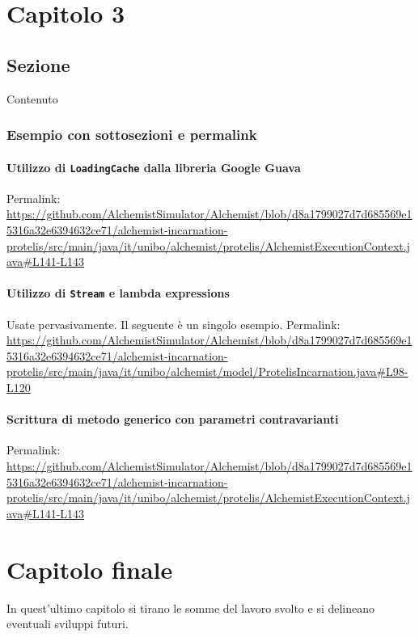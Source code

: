\documentclass[a4paper,12pt]{report}
\begin{document}
\chapter{Capitolo 3}
\section{Sezione}

Contenuto

\subsection{Esempio con sottosezioni e permalink}

\subsubsection{Utilizzo di \texttt{LoadingCache} dalla libreria Google Guava}

Permalink: \url{https://github.com/AlchemistSimulator/Alchemist/blob/d8a1799027d7d685569e15316a32e6394632ce71/alchemist-incarnation-protelis/src/main/java/it/unibo/alchemist/protelis/AlchemistExecutionContext.java#L141-L143}

\subsubsection{Utilizzo di \texttt{Stream} e lambda expressions}

Usate pervasivamente. Il seguente è un singolo esempio.
Permalink: \url{https://github.com/AlchemistSimulator/Alchemist/blob/d8a1799027d7d685569e15316a32e6394632ce71/alchemist-incarnation-protelis/src/main/java/it/unibo/alchemist/model/ProtelisIncarnation.java#L98-L120}

\subsubsection{Scrittura di metodo generico con parametri contravarianti}

Permalink: \url{https://github.com/AlchemistSimulator/Alchemist/blob/d8a1799027d7d685569e15316a32e6394632ce71/alchemist-incarnation-protelis/src/main/java/it/unibo/alchemist/protelis/AlchemistExecutionContext.java#L141-L143}

\chapter{Capitolo finale}

In quest'ultimo capitolo si tirano le somme del lavoro svolto e si delineano eventuali sviluppi
futuri.
\end{document}
